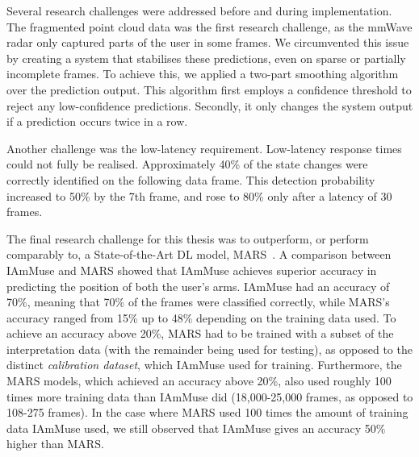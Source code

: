 Several research challenges were addressed before and during implementation.
The fragmented point cloud data was the first research challenge, as the mmWave radar only captured parts of the user in some frames.
We circumvented this issue by creating a system that stabilises these predictions, even on sparse or partially incomplete frames.
To achieve this, we applied a two-part smoothing algorithm over the prediction output.
This algorithm first employs a confidence threshold to reject any low-confidence predictions. 
Secondly, it only changes the system output if a prediction occurs twice in a row.

Another challenge was the low-latency requirement. 
Low-latency response times could not fully be realised.
Approximately 40\% of the state changes were correctly identified on the following data frame.
This detection probability increased to 50\% by the 7th frame, and rose to 80\% only after a latency of 30 frames.


The final research challenge for this thesis was to outperform, or perform comparably to, a State-of-the-Art DL model, MARS~\cite{an2021mars}.
A comparison between IAmMuse and MARS showed that IAmMuse achieves superior accuracy in predicting the position of both the user's arms.
IAmMuse had an accuracy of 70\%, meaning that 70\% of the frames were classified correctly, while MARS's accuracy ranged from 15\% up to 48\% depending on the training data used.
To achieve an accuracy above 20\%, MARS had to be trained with a subset of the interpretation data (with the remainder being used for testing), as opposed to the distinct \textit{calibration dataset}, which IAmMuse used for training.
Furthermore, the MARS models, which achieved an accuracy above 20\%, also used roughly 100 times more training data than IAmMuse did (18,000-25,000 frames, as opposed to 108-275 frames).
In the case where MARS used 100 times the amount of training data IAmMuse used, we still observed that IAmMuse gives an accuracy 50\% higher than MARS.


